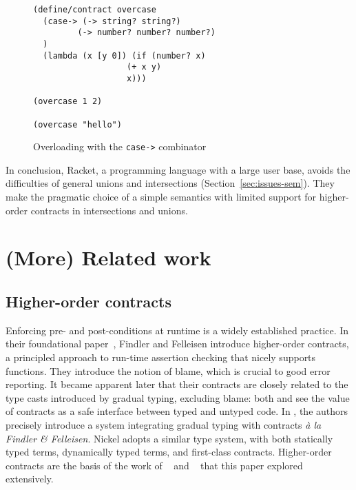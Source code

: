 \documentclass[sigplan,10pt]{acmart}
\newcommand{\unsure}[2][1=]{}
\newcommand{\info}[2][1=]{}
\newcommand{\racket}[1]{\lstinline[language=racket]{#1}}
\begin{document}
\begin{figure}[h]
\begin{lstlisting}[language=racket]
(define/contract overcase
  (case-> (-> string? string?)
         (-> number? number? number?)
  )
  (lambda (x [y 0]) (if (number? x)
                   (+ x y)
                   x)))

(overcase 1 2)

(overcase "hello")
\end{lstlisting}
\caption{Overloading with the \racket{case->} combinator}
\label{fig:racket-case-fun}
\end{figure}

In conclusion, Racket, a programming language with a large user base,
avoids the difficulties of general unions and intersections (Section~\ref{sec:issues-sem}). They make
the pragmatic choice of a simple semantics with limited support for
higher-order contracts in intersections and unions.

\section{(More) Related work}
\label{sec:related-work}
\info{Including a mention of statically typed systems with union}

\unsure{WARNING: what is below is being reworked by Yann}

\subsection{Higher-order contracts}

Enforcing pre- and post-conditions at runtime is a widely established practice.
In their foundational paper~\cite{FindlerFelleisenHOContracts}, Findler and
Felleisen introduce higher-order contracts, a principled approach to run-time
assertion checking that nicely supports functions. They introduce the notion of
blame, which is crucial to good error reporting. It became apparent later that
their contracts are closely related to the type casts introduced by gradual
typing, excluding blame: both \cite{FindlerMultiLang} and
\cite{FelleisenInterLang} see the value of contracts as a safe interface between
typed and untyped code. In \cite{WellTypedBlamed}, the authors precisely
introduce a system integrating gradual typing with contracts \textit{à la
Findler \& Felleisen}. Nickel adopts a similar type system, with both statically
typed terms, dynamically typed terms, and first-class contracts. Higher-order
contracts are the basis of the work of
\citeauthor{KeilThiemannUnionIntersection}~\cite{KeilThiemannUnionIntersection}
and \citeauthor{RootCauseOfBlame}~\cite{RootCauseOfBlame} that this paper
explored extensively.
\end{document}
